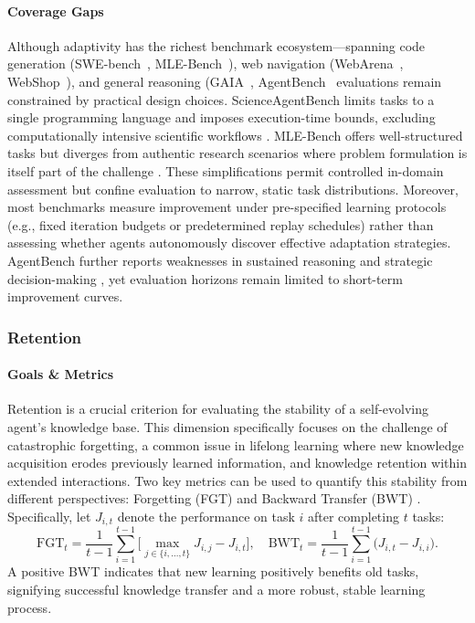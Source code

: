 \paragraph{Coverage Gaps}
Although adaptivity has the richest benchmark ecosystem—spanning code generation (SWE-bench~\citep{jimenez2023swe}, MLE-Bench~\citep{chan2024mle}), web navigation (WebArena~\citep{zhou2023webarena}, WebShop~\citep{yao2022webshop}), and general reasoning (GAIA~\citep{mialon2023gaia}, AgentBench~\citep{liu2023agentbench} evaluations remain constrained by practical design choices. ScienceAgentBench limits tasks to a single programming language and imposes execution-time bounds, excluding computationally intensive scientific workflows \citep{chen2024scienceagentbench}. MLE-Bench offers well-structured tasks but diverges from authentic research scenarios where problem formulation is itself part of the challenge \citep{chan2024mle}. These simplifications permit controlled in-domain assessment but confine evaluation to narrow, static task distributions. Moreover, most benchmarks measure improvement under pre-specified learning protocols (e.g., fixed iteration budgets or predetermined replay schedules) rather than assessing whether agents autonomously discover effective adaptation strategies. AgentBench further reports weaknesses in sustained reasoning and strategic decision-making \citep{liu2023agentbench}, yet evaluation horizons remain limited to short-term improvement curves.



\subsubsection{Retention}
\paragraph{Goals \& Metrics} Retention is a crucial criterion for evaluating the stability of a self-evolving agent's knowledge base. This dimension specifically focuses on the challenge of catastrophic forgetting, a common issue in lifelong learning where new knowledge acquisition erodes previously learned information, and knowledge retention within extended interactions. Two key metrics can be used to quantify this stability from different perspectives: Forgetting (FGT) and Backward Transfer (BWT) \citep{zheng2025lifelong}. Specifically, let $J_{i,t}$ denote the performance on task $i$ after completing $t$ tasks:
\[
\mathrm{FGT}_t = \frac{1}{t-1} \sum_{i=1}^{t-1}\!\Big[\max_{j\in \{i,\ldots,t\}} J_{i,j} - J_{i,t}\Big],\quad
\mathrm{BWT}_t=\frac{1}{t-1}\sum_{i=1}^{t-1}\big(J_{i,t}-J_{i,i}\big).
\]
A positive BWT indicates that new learning positively benefits old tasks, signifying successful knowledge transfer and a more robust, stable learning process. 

